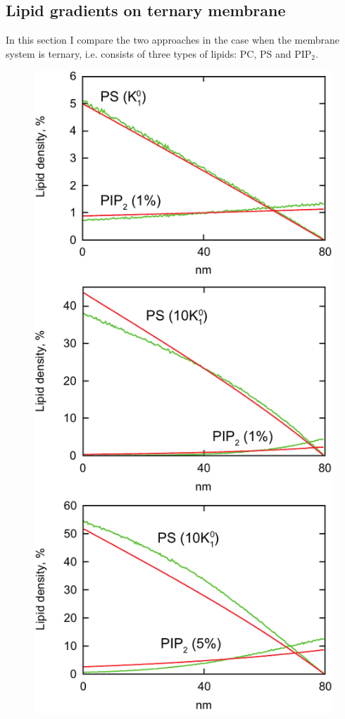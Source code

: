 \subsection{Lipid gradients on ternary membrane}

In this section I compare the two approaches in the case when the membrane system is ternary, i.e. consists of three types of lipids: PC, PS and PIP$_2$.
\begin{figure}[!ht]
\centering
  \includegraphics[scale=1.03]{../figures/double_grad1_half_lattice.pdf}


\end{figure}
